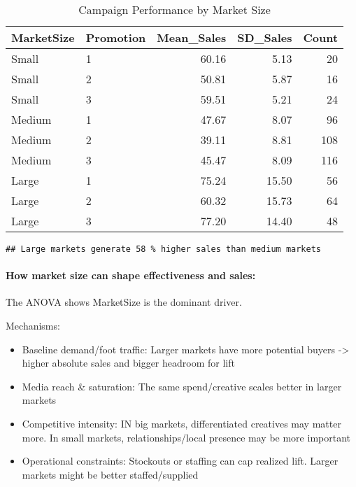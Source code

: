 \documentclass[
]{article}
\providecommand{\tightlist}{%
  \setlength{\itemsep}{0pt}\setlength{\parskip}{0pt}}
\begin{document}
\begin{longtable}[t]{llrrr}
\caption{\label{tab:market_size_analysis}Campaign Performance by Market Size}\\
\toprule
MarketSize & Promotion & Mean\_Sales & SD\_Sales & Count\\
\midrule
Small & 1 & 60.16 & 5.13 & 20\\
Small & 2 & 50.81 & 5.87 & 16\\
Small & 3 & 59.51 & 5.21 & 24\\
Medium & 1 & 47.67 & 8.07 & 96\\
Medium & 2 & 39.11 & 8.81 & 108\\
\addlinespace
Medium & 3 & 45.47 & 8.09 & 116\\
Large & 1 & 75.24 & 15.50 & 56\\
Large & 2 & 60.32 & 15.73 & 64\\
Large & 3 & 77.20 & 14.40 & 48\\
\bottomrule
\end{longtable}

\begin{verbatim}
## Large markets generate 58 % higher sales than medium markets
\end{verbatim}

\paragraph{How market size can shape effectiveness and
sales:}\label{how-market-size-can-shape-effectiveness-and-sales}

The ANOVA shows MarketSize is the dominant driver.

Mechanisms:

\begin{itemize}
\tightlist
\item
  Baseline demand/foot traffic: Larger markets have more potential
  buyers -\textgreater{} higher absolute sales and bigger headroom for
  lift
\item
  Media reach \& saturation: The same spend/creative scales better in
  larger markets
\item
  Competitive intensity: IN big markets, differentiated creatives may
  matter more. In small markets, relationships/local presence may be
  more important
\item
  Operational constraints: Stockouts or staffing can cap realized lift.
  Larger markets might be better staffed/supplied
\end{itemize}
\end{document}
